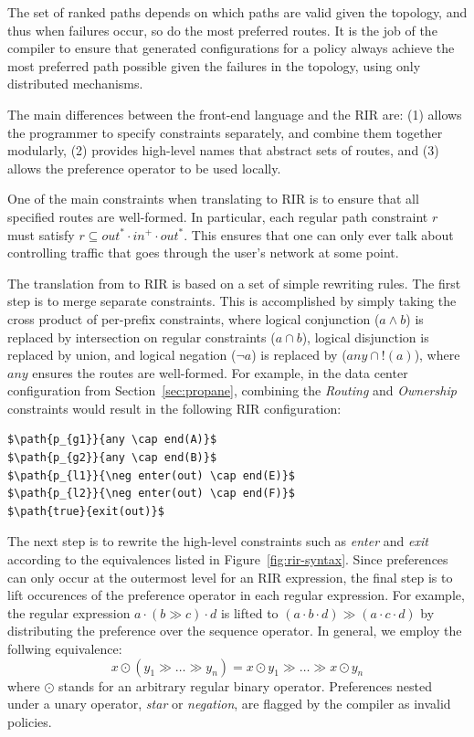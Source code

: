 The set of ranked paths depends on which paths are valid given the topology, and thus when failures occur, so do the most preferred routes. It is the job of the \sysname compiler to ensure that generated configurations for a policy always achieve the most preferred path possible given the failures in the topology, using only distributed mechanisms.



The main differences between the \sysname front-end language and the RIR are: (1) \sysname allows the programmer to specify constraints separately, and combine them together modularly, (2) \sysname provides high-level names that abstract sets of routes, and (3) \sysname allows the preference operator to be used locally.

One of the main constraints when translating to RIR is to ensure that all specified routes are well-formed. In particular, each regular path constraint $r$ must satisfy $r \subseteq out^* \cdot in^+ \cdot out^*$. This ensures that one can only ever talk about controlling traffic that goes through the user's network at some point.

The translation from \sysname to RIR is based on a set of simple rewriting rules.
The first step is to merge separate constraints. This is accomplished by simply taking the cross product of per-prefix constraints, where logical conjunction ($a \wedge b$) is replaced by intersection on regular constraints ($a \cap b$), logical disjunction is replaced by union, and logical negation ($\neg a$) is replaced by ($any \cap !(a)$), where $any$ ensures the routes are well-formed.
%
For example, in the data center configuration from Section~\ref{sec:propane}, combining the \textit{Routing} and \textit{Ownership} constraints would result in the following RIR configuration:

\begin{lstlisting}[mathescape=true]
$\path{p_{g1}}{any \cap end(A)}$
$\path{p_{g2}}{any \cap end(B)}$
$\path{p_{l1}}{\neg enter(out) \cap end(E)}$
$\path{p_{l2}}{\neg enter(out) \cap end(F)}$
$\path{true}{exit(out)}$
\end{lstlisting}

The next step is to rewrite the high-level constraints such as \textit{enter} and \textit{exit} according to the equivalences listed in Figure~\ref{fig:rir-syntax}. Since preferences can only occur at the outermost level for an RIR expression, the final step is to lift occurences of the preference operator in each regular expression. For example, the regular expression $a \cdot (b \gg c) \cdot d$ is lifted to $(a \cdot b \cdot d) \gg (a \cdot c \cdot d)$ by distributing the preference over the sequence operator. In general, we employ the follwing equivalence:
%
$$x \odot (y_1 \gg \dots \gg y_n) = x \odot y_1 \gg \dots \gg x \odot y_n$$
%
where $\odot$ stands for an arbitrary regular binary operator. Preferences nested under a unary operator, \textit{star} or \textit{negation}, are flagged by the compiler as invalid policies.



